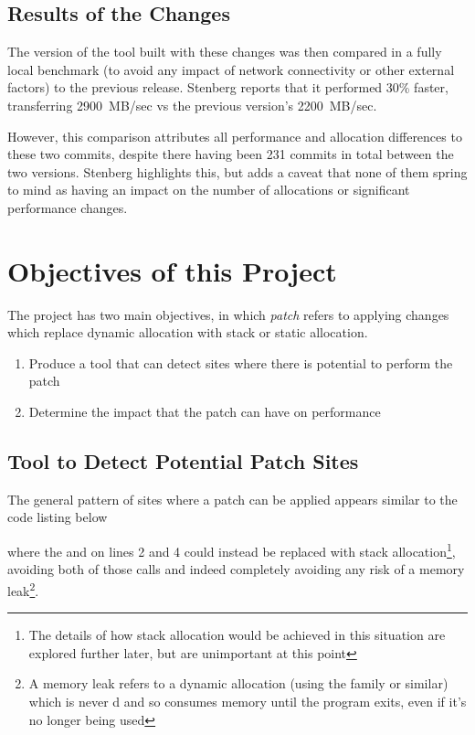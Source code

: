 \subsection{Results of the Changes}

The version of the tool built with these changes was then compared in a fully local benchmark (to avoid any impact of network connectivity or other external factors) to the previous release. Stenberg reports that it performed 30\% faster, transferring 2900~MB/sec vs the previous version's 2200~MB/sec.

However, this comparison attributes all performance and allocation differences to these two commits, despite there having been 231 commits in total between the two versions. Stenberg highlights this, but adds a caveat that none of them spring to mind as having an impact on the number of allocations or significant performance changes.

\section{Objectives of this Project}

The project has two main objectives, in which \textit{patch} refers to applying changes which replace dynamic allocation with stack or static allocation.

\begin{enumerate}
	\itemsep-0.25em
	\item Produce a tool that can detect sites where there is potential to perform the patch
	\item Determine the impact that the patch can have on performance
\end{enumerate}

\subsection{Tool to Detect Potential Patch Sites}

The general pattern of sites where a patch can be applied appears similar to the code listing below



where the \malloc{} and \free{} on lines 2 and 4 could instead be replaced with stack allocation\footnote{The details of how stack allocation would be achieved in this situation are explored further later, but are unimportant at this point}, avoiding both of those calls and indeed completely avoiding any risk of a memory leak\footnote{A memory leak refers to a dynamic allocation (using the \malloc{} family or similar) which is never \free{}d and so consumes memory until the program exits, even if it's no longer being used}.

